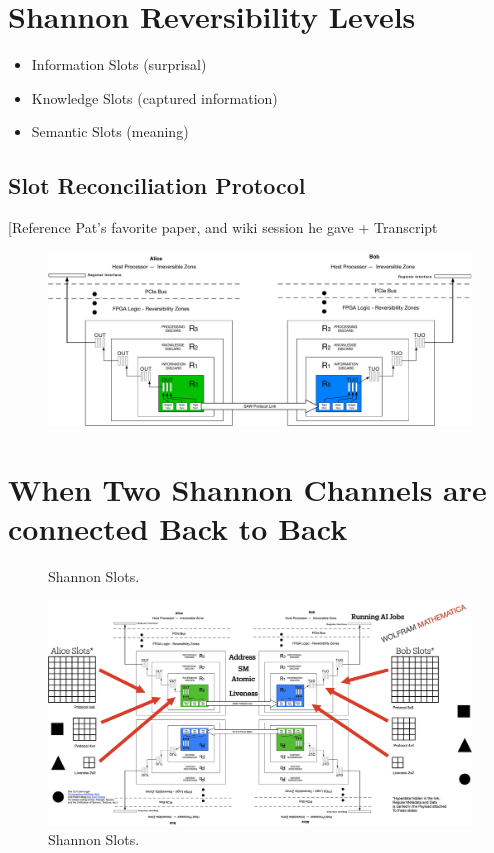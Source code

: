 \documentclass[../HFT-main.tex]{subfiles}
\begin{document}
\section{Shannon Reversibility Levels}

\begin{itemize}
\item Information Slots (surprisal)
\item Knowledge Slots (captured information)
\item Semantic Slots (meaning)
\end{itemize}

\subsection{Slot Reconciliation Protocol}

[Reference Pat's favorite paper, and wiki session he gave + Transcript

\begin{fullwidth}
\begin{figure}[ht]
  \centering
  \includegraphics[width=1.5\linewidth]{../figures/Shannon-Reversibility-Levels.pdf}

\end{figure}
\end{fullwidth}


\clearpage
\section{When Two Shannon Channels are connected Back to Back}

\begin{figure}[ht]
  \caption{Shannon Slots.}
  \centering
  \includegraphics[width=1.6\linewidth]{../figures/Shannon-slots.png}
  \caption{Shannon Slots.}
\end{figure}
\end{document}
